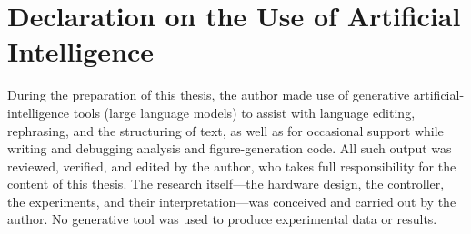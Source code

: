 \chapter*{Declaration on the Use of Artificial Intelligence}

During the preparation of this thesis, the author made use of generative artificial-intelligence tools (large language models) to assist with language editing, rephrasing, and the structuring of text, as well as for occasional support while writing and debugging analysis and figure-generation code. All such output was reviewed, verified, and edited by the author, who takes full responsibility for the content of this thesis. The research itself---the hardware design, the controller, the experiments, and their interpretation---was conceived and carried out by the author. No generative tool was used to produce experimental data or results.

\vspace{1\baselineskip}

\reportAuthor
